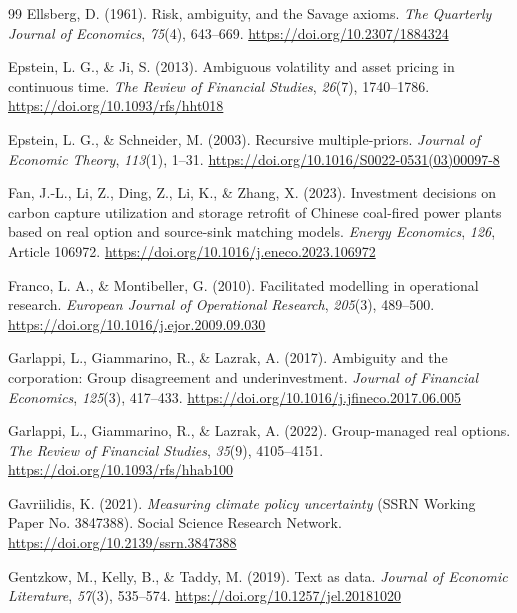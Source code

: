 \documentclass[5p,times,authoryear]{elsarticle}
\theoremstyle{plain}
\begin{document}
\begin{thebibliography}{99}
Ellsberg, D. (1961). Risk, ambiguity, and the Savage axioms. \emph{The Quarterly Journal of Economics}, \emph{75}(4), 643--669. \url{https://doi.org/10.2307/1884324}

Epstein, L. G., \& Ji, S. (2013). Ambiguous volatility and asset pricing in continuous time. \emph{The Review of Financial Studies}, \emph{26}(7), 1740--1786. \url{https://doi.org/10.1093/rfs/hht018}

Epstein, L. G., \& Schneider, M. (2003). Recursive multiple-priors. \emph{Journal of Economic Theory}, \emph{113}(1), 1--31. \url{https://doi.org/10.1016/S0022-0531(03)00097-8}

Fan, J.-L., Li, Z., Ding, Z., Li, K., \& Zhang, X. (2023). Investment decisions on carbon capture utilization and storage retrofit of Chinese coal-fired power plants based on real option and source-sink matching models. \emph{Energy Economics}, \emph{126}, Article 106972. \url{https://doi.org/10.1016/j.eneco.2023.106972}

Franco, L. A., \& Montibeller, G. (2010). Facilitated modelling in operational research. \emph{European Journal of Operational Research}, \emph{205}(3), 489--500. \url{https://doi.org/10.1016/j.ejor.2009.09.030}

Garlappi, L., Giammarino, R., \& Lazrak, A. (2017). Ambiguity and the corporation: Group disagreement and underinvestment. \emph{Journal of Financial Economics}, \emph{125}(3), 417--433. \url{https://doi.org/10.1016/j.jfineco.2017.06.005}

Garlappi, L., Giammarino, R., \& Lazrak, A. (2022). Group-managed real options. \emph{The Review of Financial Studies}, \emph{35}(9), 4105--4151. \url{https://doi.org/10.1093/rfs/hhab100}

Gavriilidis, K. (2021). \emph{Measuring climate policy uncertainty} (SSRN Working Paper No. 3847388). Social Science Research Network. \url{https://doi.org/10.2139/ssrn.3847388}

Gentzkow, M., Kelly, B., \& Taddy, M. (2019). Text as data. \emph{Journal of Economic Literature}, \emph{57}(3), 535--574. \url{https://doi.org/10.1257/jel.20181020}


\end{thebibliography}
\end{document}
